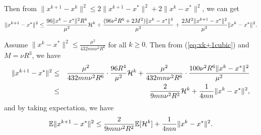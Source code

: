 \documentclass[12pt]{article}
\begin{document}
Then from $\|x^{k+1} - x^k\|^2 \leq 2\|x^{k+1} - x^*\|^2 + 2\|x^k - x^*\|^2$, we can get 
\begin{equation}\label{eq:xk+1cubic}
\|x^{k+1} - x^*\|^2 \leq \frac{96\|x^k - x^*\|^2 R^4}{\mu^2}{\cal H}^k + \frac{(96\nu^2 R^6 + 2M^2) \|x^k - x^*\|^4 }{\mu^2} + \frac{2M^2\|x^{k+1} - x^*\|^2}{\mu^2} \| x^k - x^* \|^2. 
\end{equation}


Assume $\|x^k - x^*\|^2 \leq \frac{\mu^2}{432m n \nu^2R^6}$ for all $k\geq 0$. Then from (\ref{eq:xk+1cubic}) and $M=\nu R^3$, we have 
\begin{eqnarray*}
	\|x^{k+1} - x^*\|^2 &\leq& \frac{\mu^2}{432mn\nu^2 R^6} \cdot \frac{96R^4}{\mu^2}{\cal H}^k + \frac{\mu^2}{432mn\nu^2 R^6} \cdot \frac{ 100\nu^2 R^6\|x^k-x^*\|^2}{\mu^2} \\ 
	&\leq& \frac{2}{9mn \nu^2 R^2} {\cal H}^k + \frac{1}{4mn} \|x^k - x^*\|^2, 
\end{eqnarray*}
and by taking expectation, we have 
\begin{equation}\label{eq:expxk+1-cubic}
\mathbb{E}\|x^{k+1} - x^*\|^2 \leq  \frac{2}{9mn \nu^2 R^2} \mathbb{E}[{\cal H}^k] + \frac{1}{4mn} \|x^k - x^*\|^2. 
\end{equation}
\end{document}
